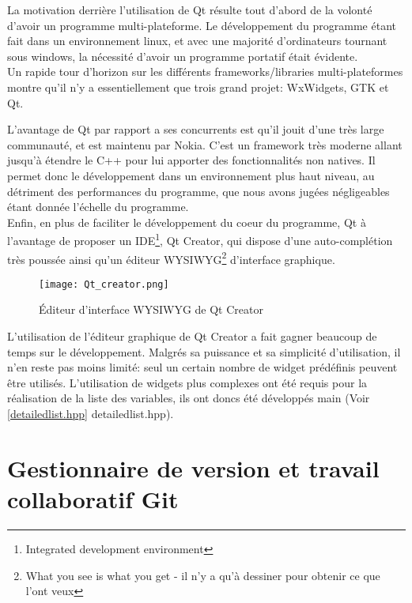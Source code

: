         La motivation derrière l'utilisation de Qt résulte tout d'abord de la volonté d'avoir un programme multi-plateforme. Le développement du programme étant fait dans un environnement linux, et avec une majorité d'ordinateurs tournant sous windows, la nécessité d'avoir un programme portatif était évidente.
        \\ Un rapide tour d'horizon sur les différents frameworks/libraries multi-plateformes montre qu'il n'y a essentiellement que trois grand projet: WxWidgets, GTK et Qt.

    \newpage
        
        L'avantage de Qt par rapport a ses concurrents est qu'il jouit d'une très large communauté, et est maintenu par Nokia. C'est un framework très moderne allant jusqu'à étendre le C++ pour lui apporter des fonctionnalités non natives. Il permet donc le développement dans un environnement plus haut niveau, au détriment des performances du programme, que nous avons jugées négligeables étant donnée l'échelle du programme.
        \\ Enfin, en plus de faciliter le développement du coeur du programme, Qt à l'avantage de proposer un IDE\footnote{Integrated development environment}, Qt Creator, qui dispose d'une auto-complétion très poussée ainsi qu'un éditeur WYSIWYG\footnote{What you see is what you get - il n'y a qu'à dessiner pour obtenir ce que l'ont veux} d'interface graphique.

        \begin{figure}[h]
            \begin{center}
                \texttt{[image: Qt\_creator.png]}
            \end{center}

            \caption{Éditeur d'interface WYSIWYG de Qt Creator}
            \label{Qt Creator}
        \end{figure}

        L'utilisation de l'éditeur graphique de Qt Creator a fait gagner beaucoup de temps sur le développement. Malgrés sa puissance et sa simplicité d'utilisation, il n'en reste pas moins limité: seul un certain nombre de widget prédéfinis peuvent être utilisés. L'utilisation de widgets plus complexes ont été requis pour la réalisation de la liste des variables, ils ont doncs été développés main (Voir \ref{detailedlist.hpp} detailedlist.hpp).

    \newpage

    \section{Gestionnaire de version et travail collaboratif Git}
